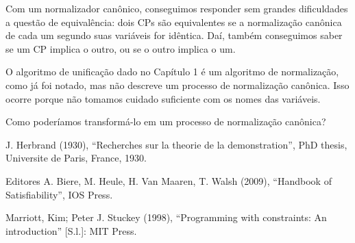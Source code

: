 \documentclass{article}
\theoremstyle{remark}
\theoremstyle{theorem}
\begin{document}
  Com um normalizador canônico, conseguimos responder sem grandes dificuldades a questão de equivalência: dois CPs são equivalentes se a normalização canônica de cada um segundo suas variáveis for idêntica. Daí, também conseguimos saber se um CP implica o outro, ou se o outro implica o um.

  O algoritmo de unificação dado no Capítulo 1 %
é um algoritmo de normalização, como já foi notado, mas não descreve um processo de normalização canônica. Isso ocorre porque não tomamos cuidado suficiente com os nomes das variáveis.

Como poderíamos transformá-lo em um processo de normalização canônica?






  \begin{thebibliography}{1}

      J. Herbrand (1930), ``Recherches sur la theorie de la demonstration'', PhD thesis, Universite de Paris, France, 1930.

      Editores A. Biere, M. Heule, H. Van Maaren, T. Walsh (2009), ``Handbook of Satisfiability'', IOS Press.

      Marriott, Kim; Peter J. Stuckey (1998), ``Programming with constraints: An introduction'' [S.l.]: MIT Press.

  \end{thebibliography}
\end{document}
